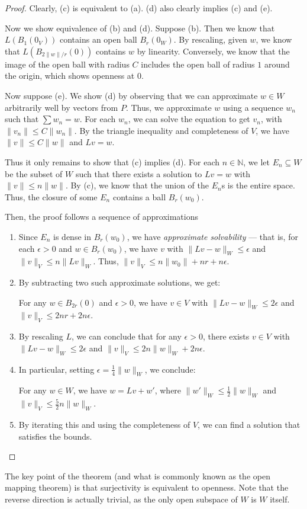 \documentclass[twoside,symmetric, openany, 12pt]{./tuftebook}
\theoremstyle{definition}
\theoremstyle{definition}
\theoremstyle{definition}
\newcommand{\N}{\mathbb{N}}
\begin{document}
\begin{proof}
	Clearly, (c) is equivalent to (a). (d) also clearly implies (c) and (e). 
	
	Now we show equivalence of (b) and (d). Suppose (b). Then we know that $L(B_1(0_V))$ contains an open ball $B_r(0_W)$. By rescaling, given $w$, we know that $L(B_{2\|w\|/r}(0))$ contains $w$ by linearity. Conversely, we know that the image of the open ball with radius $C$ includes the open ball of radius $1$ around the origin, which shows openness at 0.  
	
	Now suppose (e). We show (d) by observing that we can approximate $w\in W$ arbitrarily well by vectors from $P$. Thus, we approximate $w$ using a sequence $w_n$ such that $\sum w_n = w$. For each $w_n$, we can solve the equation to get $v_n$, with $\| v_n\| \le C \| w_n\|$. By the triangle inequality and completeness of $V$, we have $\|v\| \le C \|w\|$ and $Lv = w$. 
	
	Thus it only remains to show that (c) implies (d). For each $n\in \N$, we let $E_n\subseteq W$ be the subset of $W$ such that there exists a solution to $Lv=w$ with $\|v\|\le n \|w\|$. By (c), we know that the union of the $E_n$s is the entire space. Thus, the closure of some $E_n$ contains a ball $B_r(w_0)$. 
	
	Then, the proof follows a sequence of approximations
	\begin{enumerate}
		\item Since $E_n$ is dense in $B_r(w_0)$, we have \emph{approximate solvability} --- that is, for each $\epsilon>0$ and $w\in B_r(w_0)$, we have $v$ with $\|Lv - w\|_W \le \epsilon$ and $\|v\|_V\le n \|Lv\|_W$. Thus, $\|v\|_V \le n \|w_0\| + nr + n\epsilon$. 
		\item By subtracting two such approximate solutions, we get:
		
		For any $w\in B_{2r}(0)$ and $\epsilon>0$, we have $v\in V$ with $\|Lv - w\|_W\le 2 \epsilon$ and $\|v\|_V \le 2 n r + 2 n \epsilon$.
		\item By rescaling $L$, we can conclude that for any $\epsilon>0$, there exists $v\in V$ with $\|Lv - w\|_W\le 2\epsilon$ and $\|v\|_V \le 2 n \|w\|_W + 2 n \epsilon$.
		\item In particular, setting $\epsilon=\frac 14 \|w\|_W$, we conclude:
		
		For any $w\in W$, we have $w=Lv + w'$, where $\|w'\|_W\le \frac 12 \|w\|_W$ and $\|v\|_V\le \frac 52 n \|w\|_W$.
		\item By iterating this and using the completeness of $V$, we can find a solution that satisfies the bounds.\qedhere
	\end{enumerate}
\end{proof}	
The key point of the theorem (and what is commonly known as the open mapping theorem) is that surjectivity is equivalent to openness. Note that the reverse direction is actually trivial, as the only open subspace of $W$ is $W$ itself. 
\end{document}
